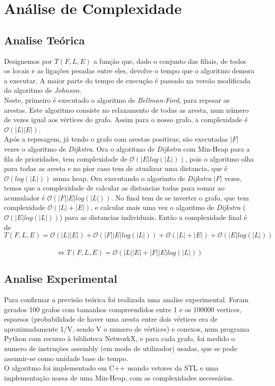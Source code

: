 \documentclass[12pt]{article}
\begin{document}
\section{Análise de Complexidade}
\subsection{Analise Teórica}
Designemos por $T(F, L ,E)$ a função que, dado o conjunto das filiais, de todos os locais e as ligações pesadas entre eles, devolve o tempo que o algoritmo demora a executar.
A maior parte do tempo de execução é passado na versão modificada do algoritmo de \textit{Johnson}. \\
\indent Neste, primeiro é executado o algoritmo de \textit{Bellman-Ford}, para repesar as arestas. Este algoritmo consiste no relaxamento de todas as aresta, num número de vezes igual aos vértices do grafo. Assim para o nosso grafo, a complexidade é $\mathcal{O}(|L||E|)$. \\
\indent Após a repesagem, já tendo o grafo com arestas positivas, são executadas $|F|$ vezes o algoritmo de \textit{Dijkstra}. Ora o algoritmo de \textit{Dijkstra} com Min-Heap para a fila de prioridades, tem complexidade de $\mathcal{O}(|E|log(|L|))$, pois o algoritmo olha para todas as aresta e no pior caso tem de atualizar uma distancia, que é $\mathcal{O}(log(|L|))$ numa heap. Ora executando o algorimto de \textit{Dijkstra} $|F|$ vezes, temos que a complexidade de calcular as distancias todas para somar ao acumulador é $\mathcal{O}(|F||E|log(|L|))$. No final tem de se inverter o grafo, que tem complexidade $\mathcal{O}(|L|+|E|)$, e calcular mais uma vez o algoritmo de \textit{Dijkstra} ($\mathcal{O}(|E|log(|L|))$) para as distancias individuais. Então a complexidade final é de \[ T(F, L ,E) = \mathcal{O}(|L||E|) + \mathcal{O}(|F||E|log(|L|)) + \mathcal{O}(|L|+|E|) + \mathcal{O}(|E|log(|L|))\] \\
\[ \Leftrightarrow  T(F, L ,E) = \mathcal{O}(|L||E| + |F||E|log(|L|))\]
\subsection{Analise Experimental}
Para confirmar a previsão teórica foi realizada uma analise experimental. Foram gerados 100 grafos com tamanhos compreendidos entre 1 e os 100000 vertices, esparsos (probabilidade de haver uma aresta entre dois vértices era de aproximadamente 1/V, sendo V o numero de vértices) e conexos, num programa Python com recurso à biblioteca NetworkX, e para cada grafo, foi medido o numero de instruções assembly (em modo de utilizador) usadas, que se pode assumir-se como unidade base de tempo.\\
\indent O algoritmo foi implementado em C++ usando vetores da STL e uma implementação nossa de uma Min-Heap, com as complexidades necessárias.
\end{document}

